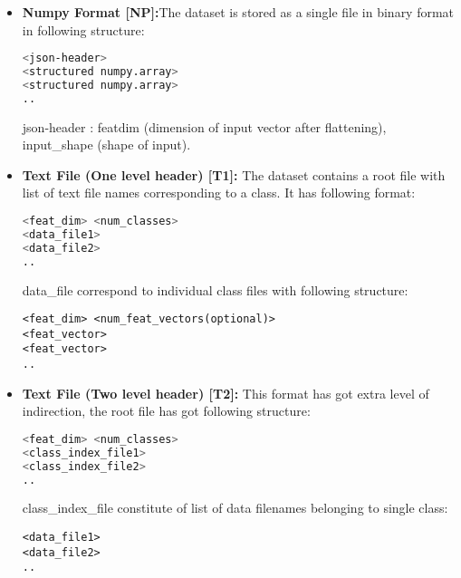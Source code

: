 \begin{itemize}
\item{\textbf {Numpy Format [NP]:}The dataset is stored as a single file in binary format in following structure:
\begin{lstlisting}[language=bash,basicstyle=\small] 
<json-header>
<structured numpy.array>
<structured numpy.array>
..
\end{lstlisting}
json-header  : featdim (dimension of input vector after flattening), input\_shape (shape of input).}

\item{\textbf {Text File (One level header) [T1]:} The dataset contains a root file with list of  text file names corresponding to a class. It has following format:
\begin{lstlisting}[language=bash,basicstyle=\small] 
<feat_dim> <num_classes>
<data_file1>
<data_file2>
..
\end{lstlisting}
data\_file correspond to individual class files with following structure:
\begin{lstlisting}[basicstyle=\small] 
<feat_dim> <num_feat_vectors(optional)>
<feat_vector>
<feat_vector>
..
\end{lstlisting}}

\item{\textbf {Text File (Two level header) [T2]:} This format has got extra level of indirection, the root file has got following structure:
\begin{lstlisting}[language=bash,basicstyle=\small] 
<feat_dim> <num_classes>
<class_index_file1>
<class_index_file2>
..
\end{lstlisting}
class\_index\_file constitute of list of data filenames belonging to single class: 
\begin{lstlisting}[basicstyle=\small] 
<data_file1>
<data_file2>
..
\end{lstlisting}}
\end{itemize}

